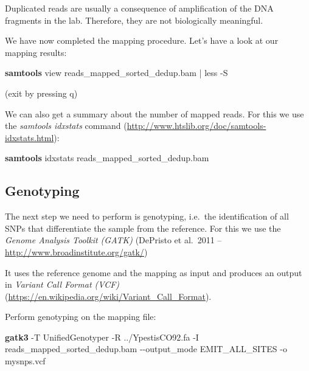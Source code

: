 \documentclass[
  letterpaper,
]{book}
\newenvironment{Shaded}{}{}
\newcommand{\AttributeTok}[1]{\textcolor[rgb]{0.84,0.23,0.29}{#1}}
\newcommand{\ExtensionTok}[1]{\textcolor[rgb]{0.84,0.23,0.29}{\textbf{#1}}}
\newcommand{\FunctionTok}[1]{\textcolor[rgb]{0.44,0.26,0.76}{#1}}
\newcommand{\KeywordTok}[1]{\textcolor[rgb]{0.84,0.23,0.29}{#1}}
\newcommand{\NormalTok}[1]{\textcolor[rgb]{0.14,0.16,0.18}{#1}}
\begin{document}
Duplicated reads are usually a consequence of amplification of the DNA
fragments in the lab. Therefore, they are not biologically meaningful.

We have now completed the mapping procedure. Let's have a look at our
mapping results:

\begin{Shaded}
\begin{Highlighting}[]
\ExtensionTok{samtools}\NormalTok{ view reads\_mapped\_sorted\_dedup.bam }\KeywordTok{|} \FunctionTok{less} \AttributeTok{{-}S}
\end{Highlighting}
\end{Shaded}

(exit by pressing q)

We can also get a summary about the number of mapped reads. For this we
use the \emph{samtools idxstats} command
(\url{http://www.htslib.org/doc/samtools-idxstats.html}):

\begin{Shaded}
\begin{Highlighting}[]
\ExtensionTok{samtools}\NormalTok{ idxstats reads\_mapped\_sorted\_dedup.bam}
\end{Highlighting}
\end{Shaded}

\hypertarget{genotyping}{%
\subsection{Genotyping}\label{genotyping}}

The next step we need to perform is genotyping, i.e.~the identification
of all SNPs that differentiate the sample from the reference. For this
we use the \emph{Genome Analysis Toolkit (GATK)} (DePristo et al.~2011
-- \url{http://www.broadinstitute.org/gatk/})

It uses the reference genome and the mapping as input and produces an
output in \emph{Variant Call Format (VCF)}
(\url{https://en.wikipedia.org/wiki/Variant_Call_Format}).

Perform genotyping on the mapping file:

\begin{Shaded}
\begin{Highlighting}[]
\ExtensionTok{gatk3} \AttributeTok{{-}T}\NormalTok{ UnifiedGenotyper }\AttributeTok{{-}R}\NormalTok{ ../YpestisCO92.fa }\AttributeTok{{-}I}\NormalTok{ reads\_mapped\_sorted\_dedup.bam }\AttributeTok{{-}{-}output\_mode}\NormalTok{ EMIT\_ALL\_SITES }\AttributeTok{{-}o}\NormalTok{ mysnps.vcf}
\end{Highlighting}
\end{Shaded}
\end{document}
